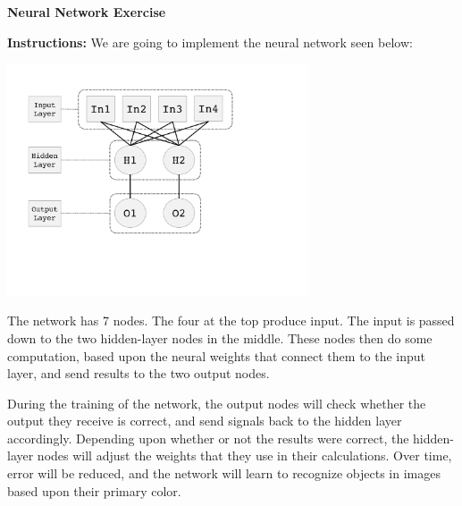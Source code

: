 \documentclass[leqno,11pt]{article}
\begin{document}
\begin{center}
{\large
	\textbf{Neural Network Exercise}
}

\hrulefill
\end{center}

\noindent
\textbf{Instructions:}  We are going to implement the neural network seen below:

\begin{center}
  \includegraphics[width=3.5in]{exampleNetwork}
  \end{center}

\vspace{6pt} 
\noindent
The network has 7 nodes.  The four at the top produce input.  The input is passed down to the two hidden-layer
nodes in the middle.  These nodes then do some computation, based upon the neural weights that connect them to
the input layer, and send results to the two output nodes.

\vspace{6pt}
\noindent 
During the training of the network, the output nodes will check whether the output they receive is correct, and
send signals back to the hidden layer accordingly.  Depending upon whether or not the results were correct, the
hidden-layer nodes will adjust the weights that they use in their calculations.  Over time, error will be
reduced, and the network will learn to recognize objects in images based upon their primary color.
\end{document}
